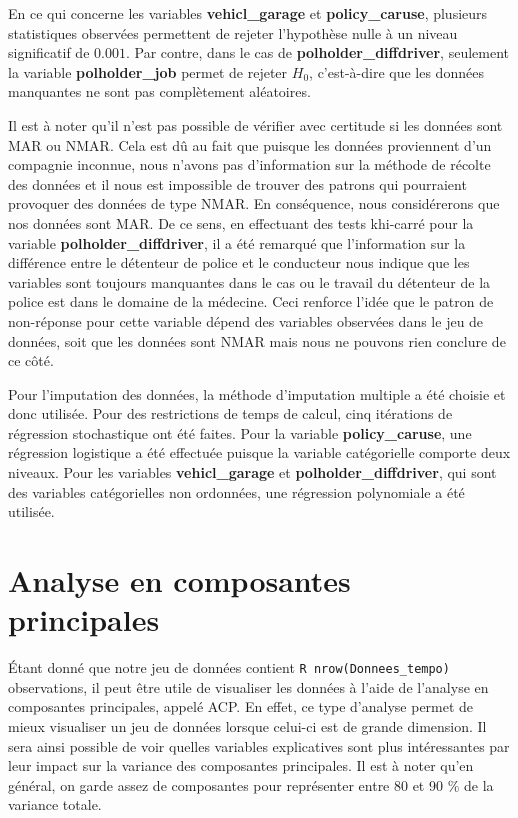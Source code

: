 \documentclass[
]{article}
\begin{document}
En ce qui concerne les variables \textbf{vehicl\_garage} et
\textbf{policy\_caruse}, plusieurs statistiques observées permettent de
rejeter l'hypothèse nulle à un niveau significatif de \(0.001%
\). Par contre, dans le cas de \textbf{polholder\_diffdriver}, seulement
la variable \textbf{polholder\_job} permet de rejeter \(H_0\),
c'est-à-dire que les données manquantes ne sont pas complètement
aléatoires.

Il est à noter qu'il n'est pas possible de vérifier avec certitude si
les données sont MAR ou NMAR. Cela est dû au fait que puisque les
données proviennent d'un compagnie inconnue, nous n'avons pas
d'information sur la méthode de récolte des données et il nous est
impossible de trouver des patrons qui pourraient provoquer des données
de type NMAR. En conséquence, nous considérerons que nos données sont
MAR. De ce sens, en effectuant des tests khi-carré pour la variable
\textbf{polholder\_diffdriver}, il a été remarqué que l'information sur
la différence entre le détenteur de police et le conducteur nous indique
que les variables sont toujours manquantes dans le cas ou le travail du
détenteur de la police est dans le domaine de la médecine. Ceci renforce
l'idée que le patron de non-réponse pour cette variable dépend des
variables observées dans le jeu de données, soit que les données sont
NMAR mais nous ne pouvons rien conclure de ce côté.

Pour l'imputation des données, la méthode d'imputation multiple a été
choisie et donc utilisée. Pour des restrictions de temps de calcul, cinq
itérations de régression stochastique ont été faites. Pour la variable
\textbf{policy\_caruse}, une régression logistique a été effectuée
puisque la variable catégorielle comporte deux niveaux. Pour les
variables \textbf{vehicl\_garage} et \textbf{polholder\_diffdriver}, qui
sont des variables catégorielles non ordonnées, une régression
polynomiale a été utilisée.

\newpage

\hypertarget{analyse-en-composantes-principales}{%
\section{Analyse en composantes
principales}\label{analyse-en-composantes-principales}}

Étant donné que notre jeu de données contient
\texttt{R\ nrow(Donnees\_tempo)} observations, il peut être utile de
visualiser les données à l'aide de l'analyse en composantes principales,
appelé ACP. En effet, ce type d'analyse permet de mieux visualiser un
jeu de données lorsque celui-ci est de grande dimension. Il sera ainsi
possible de voir quelles variables explicatives sont plus intéressantes
par leur impact sur la variance des composantes principales. Il est à
noter qu'en général, on garde assez de composantes pour représenter
entre 80 et 90 \% de la variance totale.
\end{document}
